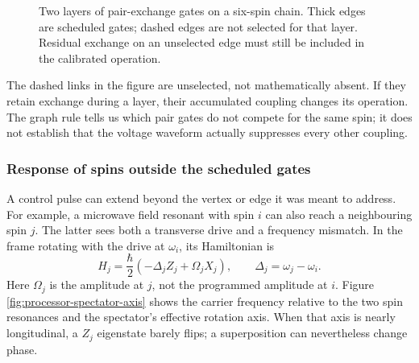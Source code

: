 \begin{figure}[htbp]
 \centering
 \caption{Two layers of pair-exchange gates on a six-spin chain.
 Thick edges are scheduled gates; dashed edges are not selected
 for that layer. Residual exchange on an unselected edge must
 still be included in the calibrated operation.}
 \label{fig:processor-gate-layers}
\end{figure}
\FloatBarrier

The dashed links in the figure are unselected, not
mathematically absent. If they retain exchange during a
layer, their accumulated coupling changes its operation.
The graph rule tells us which pair gates do not compete
for the same spin; it does not establish that the voltage
waveform actually suppresses every other coupling.

\subsubsection{Response of spins outside the scheduled gates}
\label{sec:processor-spectator-addressing}

A control pulse can extend beyond the vertex or edge it
was meant to address. For example, a microwave field
resonant with spin \(i\) can also reach a neighbouring
spin \(j\). The latter sees both a transverse drive and
a frequency mismatch. In the frame rotating with the
drive at \(\omega_i\), its Hamiltonian is
\[
 H_j=\frac{\hbar}{2}(-\Delta_j Z_j+\Omega_j X_j),
 \qquad \Delta_j=\omega_j-\omega_i.
\]
Here \(\Omega_j\) is the amplitude at \(j\), not the
programmed amplitude at \(i\). Figure~
\ref{fig:processor-spectator-axis} shows the carrier
frequency relative to the two spin resonances and the
spectator's effective rotation axis. When that axis is
nearly longitudinal, a \(Z_j\) eigenstate barely flips;
a superposition can nevertheless change phase.

